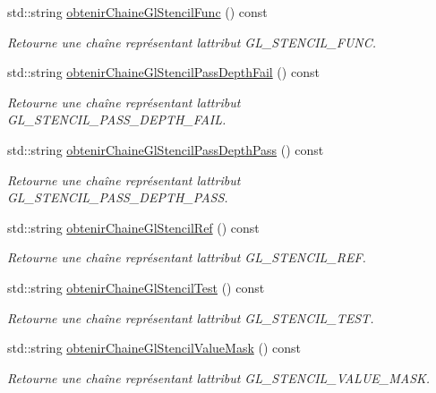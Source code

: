 \begin{DoxyCompactItemize}
std\+::string \hyperlink{group__utilitaire_ga1afa1d486d88c628562ec9e9ba6f6e10}{obtenir\+Chaine\+Gl\+Stencil\+Func} () const 
\begin{DoxyCompactList}\small\item\em Retourne une chaîne représentant l\textquotesingle{}attribut G\+L\+\_\+\+S\+T\+E\+N\+C\+I\+L\+\_\+\+F\+U\+N\+C. \end{DoxyCompactList}\item 
std\+::string \hyperlink{group__utilitaire_ga2e0217d78bce7c9e8aa865fa1b2d7e1f}{obtenir\+Chaine\+Gl\+Stencil\+Pass\+Depth\+Fail} () const 
\begin{DoxyCompactList}\small\item\em Retourne une chaîne représentant l\textquotesingle{}attribut G\+L\+\_\+\+S\+T\+E\+N\+C\+I\+L\+\_\+\+P\+A\+S\+S\+\_\+\+D\+E\+P\+T\+H\+\_\+\+F\+A\+I\+L. \end{DoxyCompactList}\item 
std\+::string \hyperlink{group__utilitaire_ga722cf069559981c09c4b40810b37986f}{obtenir\+Chaine\+Gl\+Stencil\+Pass\+Depth\+Pass} () const 
\begin{DoxyCompactList}\small\item\em Retourne une chaîne représentant l\textquotesingle{}attribut G\+L\+\_\+\+S\+T\+E\+N\+C\+I\+L\+\_\+\+P\+A\+S\+S\+\_\+\+D\+E\+P\+T\+H\+\_\+\+P\+A\+S\+S. \end{DoxyCompactList}\item 
std\+::string \hyperlink{group__utilitaire_ga31c961d29726d9daaf4d7cfc78025a6b}{obtenir\+Chaine\+Gl\+Stencil\+Ref} () const 
\begin{DoxyCompactList}\small\item\em Retourne une chaîne représentant l\textquotesingle{}attribut G\+L\+\_\+\+S\+T\+E\+N\+C\+I\+L\+\_\+\+R\+E\+F. \end{DoxyCompactList}\item 
std\+::string \hyperlink{group__utilitaire_ga3c3fb4e59ed994063e62893114882ad7}{obtenir\+Chaine\+Gl\+Stencil\+Test} () const 
\begin{DoxyCompactList}\small\item\em Retourne une chaîne représentant l\textquotesingle{}attribut G\+L\+\_\+\+S\+T\+E\+N\+C\+I\+L\+\_\+\+T\+E\+S\+T. \end{DoxyCompactList}\item 
std\+::string \hyperlink{group__utilitaire_ga88f72c76847937fa57511a7758f43d43}{obtenir\+Chaine\+Gl\+Stencil\+Value\+Mask} () const 
\begin{DoxyCompactList}\small\item\em Retourne une chaîne représentant l\textquotesingle{}attribut G\+L\+\_\+\+S\+T\+E\+N\+C\+I\+L\+\_\+\+V\+A\+L\+U\+E\+\_\+\+M\+A\+S\+K. \end{DoxyCompactList}\item 

\end{DoxyCompactItemize}
